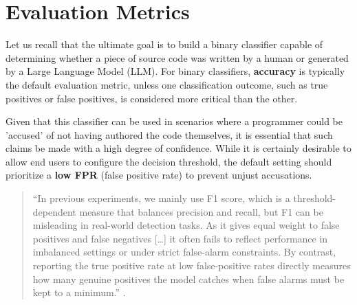 \section{Evaluation Metrics}
Let us recall that the ultimate goal is to build a 
binary classifier capable of determining whether a piece 
of source code was written by a human or generated by a 
Large Language Model (LLM). For binary classifiers, 
\textbf{accuracy} is typically the default evaluation 
metric, unless one classification outcome, such as true 
positives or false positives, is considered more critical 
than the other. 

Given that this classifier can be used 
in scenarios where a programmer could be 'accused' of 
not having authored the code themselves, it is essential 
that such claims be made with a high degree of confidence. 
While it is certainly desirable to allow end users to 
configure the decision threshold, the default setting 
should prioritize a \textbf{low FPR} (false positive rate) 
to prevent unjust accusations.
\begin{quote}
    “In previous experiments, we mainly use F1 score, 
    which is a threshold-dependent measure that balances 
    precision and recall, but F1 can be misleading in 
    real-world detection tasks. As it gives equal weight 
    to false positives and false negatives […] it often 
    fails to reflect performance in imbalanced settings or 
    under strict false-alarm constraints. By contrast, 
    reporting the true positive rate at low false-positive 
    rates directly measures how many genuine positives the 
    model catches when false alarms must be kept to a minimum.”
    \cite{guo2025codemirage}.
\end{quote}